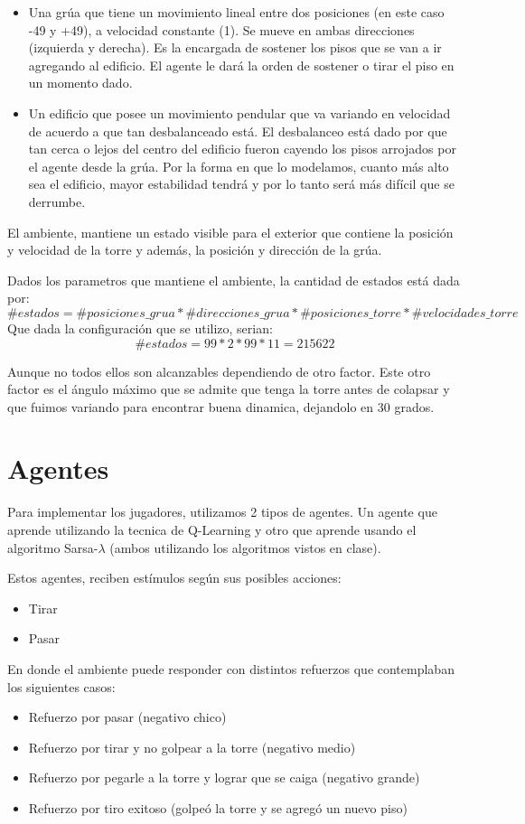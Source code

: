 \documentclass[11pt, a4paper]{article}
\newcommand{\slambda}{Sarsa-$\lambda$ }
\begin{document}
\begin{itemize}
\item Una grúa que tiene un movimiento lineal entre dos posiciones (en este caso -49 y +49), a velocidad constante (1). Se mueve en ambas direcciones (izquierda y derecha). Es la encargada de sostener los pisos que se van a ir agregando al edificio. El agente le dará la orden de sostener o tirar el piso en un momento dado. 

\item Un edificio que posee un movimiento pendular que va variando en velocidad de acuerdo a que tan desbalanceado est\'a. El desbalanceo está dado por que tan cerca o lejos del centro del edificio fueron cayendo los pisos arrojados por el agente desde la grúa. Por la forma en que lo modelamos, cuanto más alto sea el edificio, mayor estabilidad tendrá y por lo tanto será más difícil que se derrumbe.
\end{itemize}

El ambiente, mantiene un estado visible para el exterior que contiene la posici\'on y velocidad de la torre y adem\'as, la posici\'on y direcci\'on de la gr\'ua. 

Dados los parametros que mantiene el ambiente, la cantidad de estados est\'a dada por:
$$ \#estados = \#posiciones\_grua * \#direcciones\_grua * \#posiciones\_torre *  \#velocidades\_torre  $$
Que dada la configuraci\'on que se utilizo, serian:
$$ \# estados = 99 * 2 * 99 * 11 = 215622 $$

Aunque no todos ellos son alcanzables dependiendo de otro factor. Este otro factor es el \'angulo m\'aximo que se admite que tenga la torre antes de colapsar y que fuimos variando para encontrar buena dinamica, dejandolo en 30 grados. 

\section{Agentes}
Para implementar los jugadores, utilizamos 2 tipos de agentes. Un agente que aprende utilizando la tecnica de Q-Learning y otro que aprende usando el algoritmo \slambda (ambos utilizando los algoritmos vistos en clase).

Estos agentes, reciben est\'imulos seg\'un sus posibles acciones: 
\begin{itemize}
\item Tirar
\item Pasar
\end{itemize}
En donde el ambiente puede responder con distintos refuerzos que contemplaban los siguientes casos:
\begin{itemize}
\item Refuerzo por pasar (negativo chico)
\item Refuerzo por tirar y no golpear a la torre (negativo medio)
\item Refuerzo por pegarle a la torre y lograr que se caiga (negativo grande)
\item Refuerzo por tiro  exitoso (golpe\'o la torre y se agreg\'o un nuevo piso)
\end{itemize}
\end{document}
